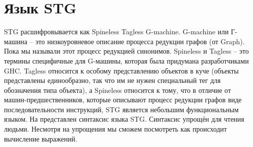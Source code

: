 \section{Язык STG}

STG расшифровывается как Spineless Tagless G-machine. 
G-machine или Г-машина -- это низкоуровневое описание 
процесса редукции графов (от Graph). Пока мы называли этот процесс
редукцией синонимов. Spineless и Tagless -- это термины специфичные
для G-машины, которая была придумана разработчиками GHC.
Tagless относится к особому представлению объектов в куче
(объекты представлены единообразно, так что им не нужен специальный
тег для обозначения типа объекта), а Spineless относится
к тому, что в отличие от машин-предшественников, которые
описывают процесс редукции графов виде последовательности
инструкций, STG является небольшим функциональным языком. 
На  представлен синтаксис языка STG. 
Синтаксис упрощён для чтения людьми. Несмотря на упрощения 
мы сможем посмотреть как происходит вычисление выражений. 
    
